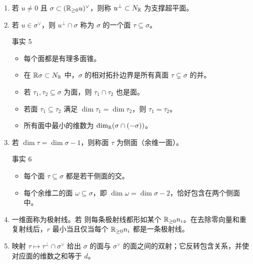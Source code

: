 \begin{enumerate}[label=(\alph*)]
\item 若 $u\ne0$ 且 $\sigma\subset(\mathbb R_{\ge0}u)^\vee$，则称 $u^\perp\subset N_{\mathbb R}$ 为支撑超平面。
\item 若 $u\in\sigma^\vee$，则 $u^\perp\cap\sigma$ 称为 $\sigma$ 的一个面 $\tau\subseteq\sigma$。
\begin{custom}{事实 5}\hypertarget{fact:5}{}\begin{itemize}
\item 每个面都是有理多面锥。
\item 在 $\mathbb R\sigma\subset N_{\mathbb R}$ 中，$\sigma$ 的相对拓扑边界是所有真面 $\tau\subsetneq\sigma$ 的并。
\item 若 $\tau_1,\tau_2\subseteq\sigma$ 为面，则 $\tau_1\cap\tau_2$ 也是面。
\item 若面 $\tau_1\subseteq\tau_2$ 满足 $\dim\tau_1=\dim\tau_2$，则 $\tau_1=\tau_2$。
\item 所有面中最小的维数为 $\dim_{\mathbb R}(\sigma\cap(-\sigma))$。
\end{itemize}\end{custom}
\item 若 $\dim\tau=\dim\sigma-1$，则称面 $\tau$ 为侧面（余维一面）。
\begin{custom}{事实 6}\hypertarget{fact:6}{}\begin{itemize}
\item 每个面 $\tau\subseteq\sigma$ 都是若干侧面的交。
\item 每个余维二的面 $\omega\subseteq\sigma$，即 $\dim\omega=\dim\sigma-2$，恰好包含在两个侧面中。
\end{itemize}\end{custom}
\item 一维面称为极射线。若
则每条极射线都形如某个 $\mathbb R_{\ge0}n_i$。在去除零向量和重复射线后，$r$ 最小当且仅当每个 $\mathbb R_{\ge0}n_i$ 都是一条极射线。
\item 映射 $\tau\mapsto\tau^\perp\cap\sigma^\vee$ 给出 $\sigma$ 的面与 $\sigma^\vee$ 的面之间的双射；它反转包含关系，并使对应面的维数之和等于 $d$。
\end{enumerate}
